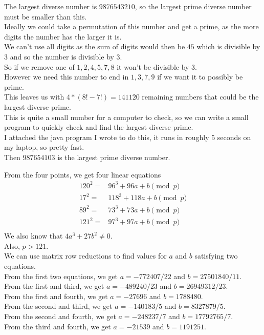 \documentclass{assignment}
\begin{document}
\begin{problemlist}
\pbitem
\begin{problem}
  The largest diverse number is $9876543210$, so the largest prime diverse number must be smaller than this.\\
  Ideally we could take a permutation of this number and get a prime, as the more digits the number has the larger it is.\\
  We can't use all digits as the sum of digits would then be $45$ which is divisible by $3$ and so the number is divisible by $3$.\\
  So if we remove one of $1,2,4,5,7,8$ it won't be divisible by $3$.\\
  However we need this number to end in $1,3,7,9$ if we want it to possibly be prime.\\
  This leaves us with $4*(8!-7!)=141120$ remaining numbers that could be the largest diverse prime.\\
  This is quite a small number for a computer to check, so we can write a small program to quickly check and find the largest diverse prime.\\
  I attached the java program I wrote to do this, it runs in roughly $5$ seconds on my laptop, so pretty fast.\\
  Then $987654103$ is the largest prime diverse number.
\end{problem}

\pbitem
\begin{problem}
  From the four points, we get four linear equations
  \begin{align*}
    120^2=&96^3+96a+b\pmod{p}\\
    17^2=&118^3+118a+b\pmod{p}\\
    89^2=&73^3+73a+b\pmod{p}\\
    121^2=&97^3+97a+b\pmod{p}\\
  \end{align*}
  We also know that $4a^3+27b^2\neq 0$.\\
  Also, $p > 121$.\\

  We can use matrix row reductions to find values for $a$ and $b$ satisfying two equations.\\
  From the first two equations, we get $a=-772407/22$ and $b=27501840/11$.\\
  From the first and third, we get $a=-489240/23$ and $b=26949312/23$.\\
  From the first and fourth, we get $a=-27696$ and $b=1788480$.\\
  From the second and third, we get $a=-140183/5$ and $b=8327879/5$.\\
  From the second and fourth, we get $a=-248237/7$ and $b=17792765/7$.\\
  From the third and fourth, we get $a=-21539$ and $b=1191251$.\\
  

\end{problem}
\end{problemlist}
\end{document}
